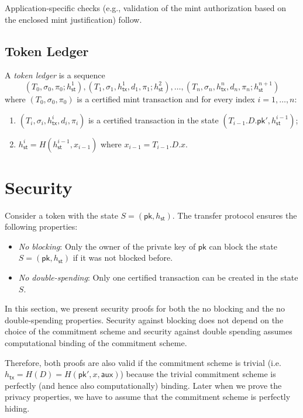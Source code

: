 \documentclass{article}
\newcommand{\pubkey}[0]{\mathsf{pk}}
\newcommand{\sthash}[0]{h_\mathsf{st}}
\newcommand{\txhash}[0]{h_\mathsf{tx}}
\newcommand{\auxd}[0]{\mathsf{aux}}
\begin{document}
\noindent Application-specific checks (e.g., validation of the mint authorization based on the enclosed mint justification) follow.

\subsection{Token Ledger}

A \emph{token ledger} is a sequence
\[
(T_0, \sigma_0, \pi_0; h^1_\mathsf{st}), (T_1, \sigma_1,\txhash^1,d_1,\pi_1; h^2_\mathsf{st}), \ldots, (T_n, \sigma_n, \txhash^n, d_n,\pi_n; h^{n+1}_\mathsf{st})
\]
where $(T_0, \sigma_0, \pi_0)$ is a certified mint transaction and for every index $i=1,\ldots, n$:
\begin{enumerate}
\item $(T_{i}, \sigma_{i}, \txhash^i,d_i, \pi_{i})$ is a certified transaction in the state $(T_{i-1}.D.\pubkey', h^{i-1}_\mathsf{st})$;
\item $h^{i}_\mathsf{st}=H(h^{i-1}_\mathsf{st},x_{i-1})$ where $x_{i-1} =T_{i-1}.D.x$.
\end{enumerate}

\section{Security}
Consider a token with the state $S = (\pubkey, \sthash)$. The transfer protocol ensures the following properties:
\begin{itemize}
\item \emph{No blocking}:
Only the owner of the private key of $\pubkey$ can block the state $S = (\pubkey, \sthash)$ if it was not blocked before.
\item \emph{No double-spending}:
Only one certified transaction can be created in the state $S$.
\end{itemize}

\noindent In this section, we present security proofs for both the no blocking and the no double-spending properties. Security against blocking does not depend on the choice of the commitment scheme and security against double spending assumes computational binding of the commitment scheme.

Therefore, both proofs are also valid if the commitment scheme is trivial (i.e. $\txhash = H(D)=H(\pubkey',x,\auxd)$) because the trivial commitment scheme is perfectly (and hence also computationally) binding. Later when we prove the privacy properties, we have to assume that the commitment scheme is perfectly hiding.
\end{document}
